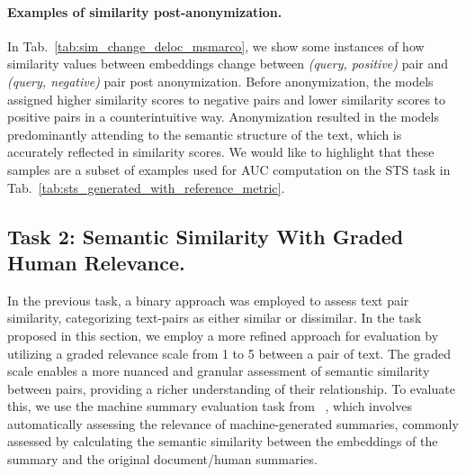 \paragraph{Examples of similarity post-anonymization.}
In Tab.~\ref{tab:sim_change_deloc_msmarco}, we show some instances of how similarity values between embeddings change between \textit{(query, positive)} pair and  \textit{(query, negative)} pair post anonymization. Before anonymization, the models assigned higher similarity scores to negative pairs and lower similarity scores to positive pairs in a counterintuitive way. Anonymization resulted in the models predominantly attending to the semantic structure of the text, which is accurately reflected in similarity scores. We would like to highlight that these samples are a subset of examples used for AUC computation on the STS task in Tab.~\ref{tab:sts_generated_with_reference_metric}.


\subsection{Task 2: Semantic Similarity With Graded Human Relevance.}
\label{sec:exp_sts_graded_1_5_summ}  

In the previous task, a binary approach was employed to assess text pair similarity, categorizing text-pairs as either similar or dissimilar.  In the task proposed in this section, we employ a more refined approach for evaluation by utilizing a graded relevance scale from 1 to 5 between a pair of text. The graded scale enables a more nuanced and granular assessment of semantic similarity between pairs, providing a richer understanding of their relationship.
To evaluate this, we use the machine summary evaluation task from ~\citet{muennighoff2022mteb}, which involves automatically assessing the relevance of machine-generated summaries, commonly assessed by calculating the semantic similarity between the embeddings of the summary and the original document/human summaries.

